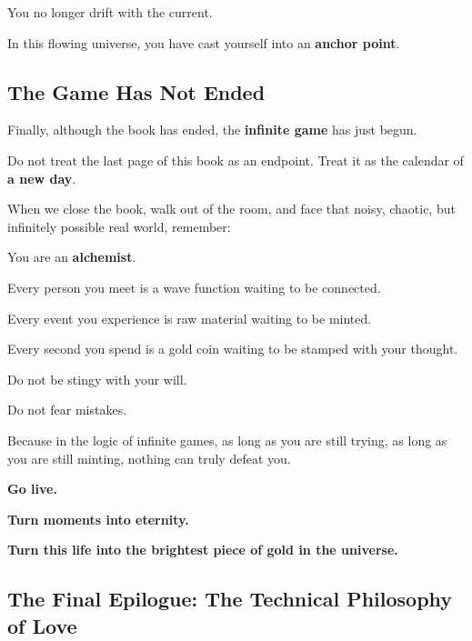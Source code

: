 You no longer drift with the current.

In this flowing universe, you have cast yourself into an \textbf{anchor point}.

\subsection{The Game Has Not Ended}

Finally, although the book has ended, the \textbf{infinite game} has just begun.

Do not treat the last page of this book as an endpoint. Treat it as the calendar of \textbf{a new day}.

When we close the book, walk out of the room, and face that noisy, chaotic, but infinitely possible real world, remember:

You are an \textbf{alchemist}.

Every person you meet is a wave function waiting to be connected.

Every event you experience is raw material waiting to be minted.

Every second you spend is a gold coin waiting to be stamped with your thought.

Do not be stingy with your will.

Do not fear mistakes.

Because in the logic of infinite games, as long as you are still trying, as long as you are still minting, nothing can truly defeat you.

\textbf{Go live.}

\textbf{Turn moments into eternity.}

\textbf{Turn this life into the brightest piece of gold in the universe.}

\subsection{The Final Epilogue: The Technical Philosophy of Love}

